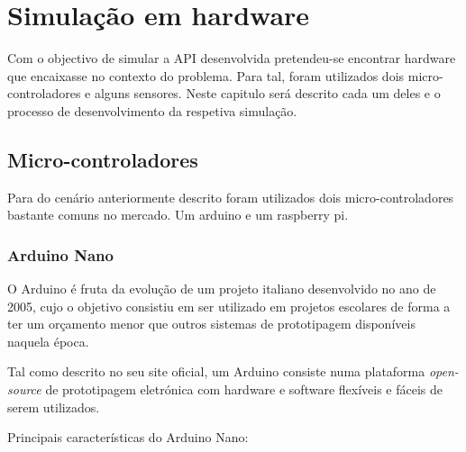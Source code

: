 
\chapter{Simulação em hardware}

Com o objectivo de simular a API desenvolvida pretendeu-se encontrar hardware que encaixasse no contexto do problema. Para tal, foram utilizados dois micro-controladores e alguns sensores. Neste capitulo será descrito cada um deles e o processo de desenvolvimento da respetiva simulação.  


\section{Micro-controladores}


Para do cenário anteriormente descrito foram utilizados dois micro-controladores bastante comuns no mercado. Um arduino e um raspberry pi.

\subsection{Arduino Nano}


O Arduino é fruta da evolução de um projeto italiano desenvolvido no ano de 2005, cujo o objetivo consistiu em ser utilizado em projetos escolares de forma a ter um orçamento menor que outros sistemas de prototipagem disponíveis naquela época.

Tal como descrito no seu site oficial, um Arduino consiste numa plataforma \textit{open-source} de prototipagem eletrónica com hardware e software flexíveis e fáceis de serem utilizados. 



Principais características do Arduino Nano: 

